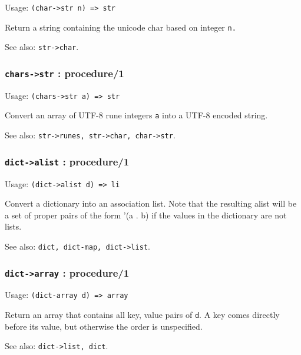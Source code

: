 \documentclass[
]{article}
\newcommand{\passthrough}[1]{#1}
\begin{document}
Usage: \passthrough{\lstinline!(char->str n) => str!}

Return a string containing the unicode char based on integer
\passthrough{\lstinline!n.!}

See also: \passthrough{\lstinline!str->char!}.

\hypertarget{chars-str-procedure1}{%
\subsubsection{\texorpdfstring{\texttt{chars-\textgreater{}str} :
procedure/1}{chars-\textgreater str : procedure/1}}\label{chars-str-procedure1}}

Usage: \passthrough{\lstinline!(chars->str a) => str!}

Convert an array of UTF-8 rune integers \passthrough{\lstinline!a!} into
a UTF-8 encoded string.

See also: \passthrough{\lstinline!str->runes, str->char, char->str!}.

\hypertarget{dict-alist-procedure1}{%
\subsubsection{\texorpdfstring{\texttt{dict-\textgreater{}alist} :
procedure/1}{dict-\textgreater alist : procedure/1}}\label{dict-alist-procedure1}}

Usage: \passthrough{\lstinline!(dict->alist d) => li!}

Convert a dictionary into an association list. Note that the resulting
alist will be a set of proper pairs of the form '(a . b) if the values
in the dictionary are not lists.

See also: \passthrough{\lstinline!dict, dict-map, dict->list!}.

\hypertarget{dict-array-procedure1}{%
\subsubsection{\texorpdfstring{\texttt{dict-\textgreater{}array} :
procedure/1}{dict-\textgreater array : procedure/1}}\label{dict-array-procedure1}}

Usage: \passthrough{\lstinline!(dict-array d) => array!}

Return an array that contains all key, value pairs of
\passthrough{\lstinline!d!}. A key comes directly before its value, but
otherwise the order is unspecified.

See also: \passthrough{\lstinline!dict->list, dict!}.
\end{document}
